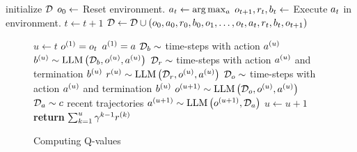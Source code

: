 \documentclass{article}
\DeclareMathOperator*{\LLM}{LLM}
\begin{document}
\begin{algorithm}[b]
  \caption{Training Loop}
  \label{algo:train}
  \begin{algorithmic}[1]
    \State initialize $\mathcal{D}$
    \State $\Obs_0 \gets$ Reset environment.
    \State $\Act_t \gets \argmax_{a}$ 
    \State $\Obs_{t+1}, \Rew_t, \Ter_t \gets$ Execute $\Act_t$ in environment.
    \State $t \gets t + 1$
    \EndWhile
    \State $\Buffer \gets \Buffer \cup
      \left(
      \Obs_0, \Act_0, \Rew_0, \Ter_0, \Obs_1, \dots,
      \Obs_t, \Act_t, \Rew_t, \Ter_t, \Obs_{t+1}
      \right)$
    \EndWhile
    \EndFunction
  \end{algorithmic}
\end{algorithm}


\begin{figure}[tb]
  \begin{algorithm}[H]
    \caption{Computing Q-values}
    \label{algo:q}
    \begin{algorithmic}[1]
      \State $u \gets t$
      \State $\Obs^1 = \Obs_t$
      \State $\Act^1 = \Act$
      \Repeat
      \State $\Buffer_{\Ter} \sim$ time-steps with action $\Act^u$ 
      \State $\Ter^u \sim \LLM\left(\Buffer_{\Ter}, \Obs^u, \Act^u\right)$
      \State $\Buffer_{\Rew} \sim$ time-steps with action $\Act^u$ and termination $\Ter^u$ 
      \State $\Rew^u \sim \LLM \left(\Buffer_{\Rew}, \Obs^u, \Act^u\right)$
      \State $\Buffer_{\Obs} \sim$ time-steps with action $\Act^u$ and termination $\Ter^u$ 
      \State $\Obs^{u+1} \sim \LLM \left(\Buffer_{\Obs}, \Obs^u, \Act^u\right)$
      \State $\BestTrajectories \sim \RecencyCutoff$ recent trajectories
      \State $\Act^{u+1} \sim \LLM\left(\Obs^{u+1}, \BestTrajectories\right)$
      \State $u \gets u + 1$
      \State \textbf{return} $\sum_{k=1}^{u} \gamma^{k - 1} \Rew^k$
      \EndFunction
    \end{algorithmic}
  \end{algorithm}
  \vspace{-20pt}
\end{figure}
\end{document}
